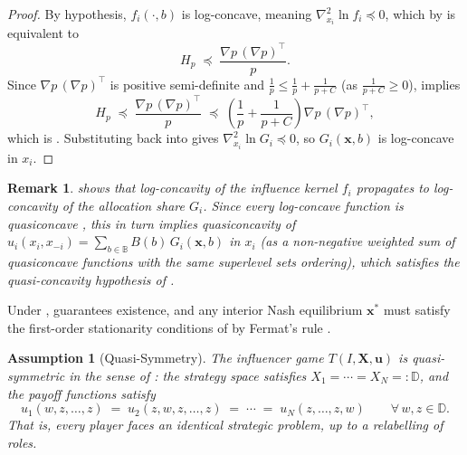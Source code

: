 \documentclass{article}
\newtheorem{assumption}{Assumption}
\newtheorem{remark}{Remark}
\begin{document}
\begin{proof}
                By hypothesis, $f_i(\cdot,b)$ is log-concave, meaning $\nabla^2_{x_i}\ln f_i \preceq 0$, which by  is equivalent to
                \begin{equation}\label{eq:SI_logconcave_cond}
                    H_p \;\preceq\; \frac{\nabla p\,(\nabla p)^\top}{p}.
                \end{equation}
                Since $\nabla p\,(\nabla p)^\top$ is positive semi-definite and $\frac{1}{p} \leq \frac{1}{p}+\frac{1}{p+C}$ (as $\frac{1}{p+C}\geq 0$),  implies
                \[
                    H_p \;\preceq\; \frac{\nabla p\,(\nabla p)^\top}{p} \;\preceq\; \left(\frac{1}{p}+\frac{1}{p+C}\right)\nabla p\,(\nabla p)^\top,
                \]
                which is . Substituting back into  gives $\nabla^2_{x_i}\ln G_i\preceq 0$, so $G_i(\mathbf{x},b)$ is log-concave in $x_i$.
            \end{proof}

            \begin{remark}
                 shows that log-concavity of the influence kernel $f_i$ propagates to log-concavity of the allocation share $G_i$. Since every log-concave function is quasiconcave \cite[Sec.~3.5.2]{boyd2004convex}, this in turn implies quasiconcavity of $u_i(x_i, x_{-i}) = \sum_{b\in\mathbb{B}}B(b)\,G_i(\mathbf{x},b)$ in $x_i$ (as a non-negative weighted sum of quasiconcave functions with the same superlevel sets ordering), which satisfies the quasi-concavity hypothesis of .
            \end{remark}

            
            Under ,  guarantees existence, and any interior Nash equilibrium $\mathbf{x}^*$ must satisfy the first-order stationarity conditions of  by Fermat's rule \cite[Thm.~27.1]{rockafellar1970convex}.
    

    \begin{assumption}[Quasi-Symmetry]\label{ass:SI_quasisym}
        The influencer game $T(I, \mathbf{X}, \mathbf{u})$ is quasi-symmetric in the
        sense of \cite{reny2020nash}: the strategy space satisfies
        $X_1 = \cdots = X_N =: \mathbb{D}$, and the payoff functions
        satisfy
        \[
            u_1(w, z, \ldots, z)
            \;=\;
            u_2(z, w, z, \ldots, z)
            \;=\;
            \cdots
            \;=\;
            u_N(z, \ldots, z, w)
            \qquad \forall\, w, z \in \mathbb{D}.
        \]
        That is, every player faces an identical strategic problem, up to a relabelling of roles.
    \end{assumption}
\end{document}
